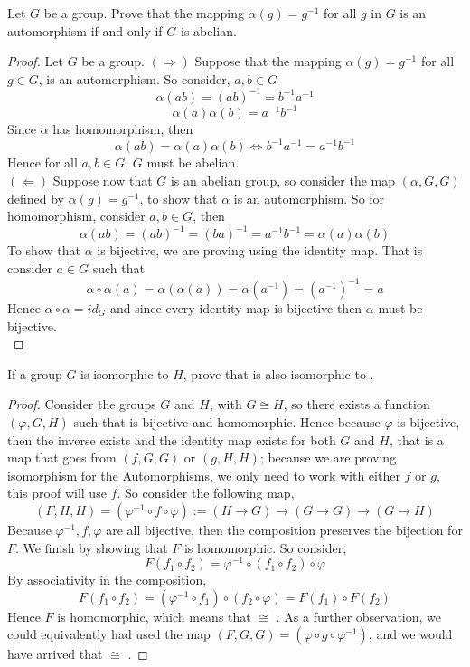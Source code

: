 \begin{assignment}[
  header=HeaderA,
  body=BodyA,
  title={Homework 4},
  duedate={\today},
  toc=false,
  toctitle={This appears on the Table of contents.},
  exlist=false
]

\begin{exer}[Problem 6.12]
Let $G$ be a group. Prove that the mapping $\alpha(g) = g^{-1}$ for all $g$ in $G$ is an automorphism if and only if $G$ is abelian.
\begin{proof}
 Let $G$ be a group. $(\Rightarrow)$ Suppose that the mapping $\alpha(g) = g^{-1}$ for all $g \in G$, is an automorphism. So consider, $a,b \in G$  
 \[
 \alpha(ab) = (ab)^{-1} = b^{-1}a^{-1}  
 \]
 \[
 \alpha(a)\alpha(b) = a^{-1}b^{-1}
 \]
 Since $\alpha$ has homomorphism, then
 \[
 \alpha(ab) = \alpha(a)\alpha(b) \iff b^{-1}a^{-1} = a^{-1}b^{-1}
 \]
 Hence for all $a,b \in G$, $G$ must be abelian.\\

 $(\Leftarrow)$ Suppose now that $G$ is an abelian group, so consider the map $(\alpha, G,G)$ defined by $\alpha(g) = g^{-1}$, to show that $\alpha$ is an automorphism. So for homomorphism, consider $a,b \in G$, then 
 \[\alpha(ab) = (ab)^{-1} = (ba)^{-1} = a^{-1}b^{-1} = \alpha(a)\alpha(b)\]
 To show that $\alpha$ is bijective, we are proving using the identity map. That is consider $a\in G$ such that
 \[\alpha \circ \alpha(a) = \alpha(\alpha(a)) = \alpha(a^{-1}) = (a^{-1})^{-1} = a\]
 Hence $\alpha \circ \alpha = id_G$ and since every identity map is bijective then $\alpha$ must be bijective.\\ 
\end{proof}    
\end{exer}


\begin{exer}[Problem 6.18]
If a group $G$ is isomorphic to $H$, prove that  is also isomorphic to . 
\begin{proof}
Consider the groups $G$ and $H$, with $G \cong H$, so there exists a function $(\varphi, G,H)$ such that is bijective and homomorphic. Hence because $\varphi$ is bijective, then the inverse exists and the identity map exists for both $G$ and $H$, that is a map that goes from $(f, G, G)$ or $(g, H,H)$; because we are proving isomorphism for the Automorphisms, we only need to work with either $f$ or $g$, this proof will use $f$. So consider the following map,
\[
(F, H,H) = (\varphi^{-1} \circ f \circ \varphi) := (H\to G) \to (G\to G) \to (G \to H)
\]
Because $\varphi^{-1},f,\varphi$ are all bijective, then the composition preserves the bijection for $F$. We finish by showing that $F$ is homomorphic. So consider,
\[
F(f_1\circ f_2) = \varphi^{-1} \circ (f_1 \circ f_2) \circ \varphi
\]
By associativity in the composition,
\[
F(f_1\circ f_2) = (\varphi^{-1} \circ f_1) \circ (f_2 \circ \varphi) = F(f_1)\circ F(f_2)
\]
Hence $F$ is homomorphic, which means that  $\cong$ . As a further observation, we could equivalently had used the map $(F, G,G) = (\varphi \circ g \circ \varphi^{-1})$, and we would have arrived that  $\cong$ . 
\end{proof}    
\end{exer}


\end{assignment}
